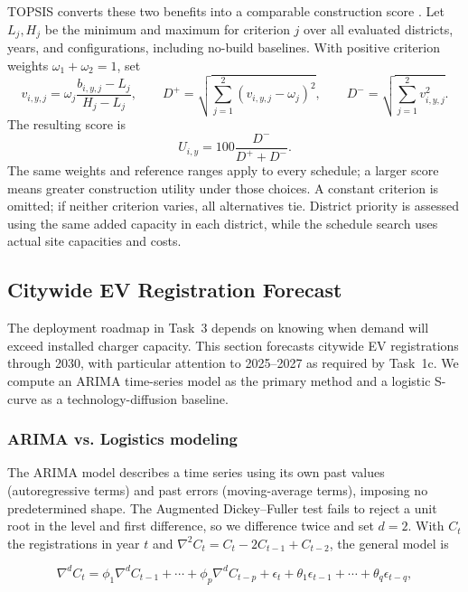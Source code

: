 \documentclass[12pt]{article}
\begin{document}
TOPSIS converts these two benefits into a comparable construction score
\cite{Hwang1981}. Let $L_j,H_j$ be the minimum and maximum for criterion $j$ over all
evaluated districts, years, and configurations, including no-build baselines. With
positive criterion weights $\omega_1+\omega_2=1$, set
\begin{equation}
v_{i,y,j}=\omega_j\frac{b_{i,y,j}-L_j}{H_j-L_j},\qquad
D^+=\sqrt{\sum_{j=1}^2(v_{i,y,j}-\omega_j)^2},\qquad
D^-=\sqrt{\sum_{j=1}^2v_{i,y,j}^2}.
\label{eq:normalize}
\end{equation}
The resulting score is
\begin{equation}
U_{i,y}=100\frac{D^-}{D^++D^-}.\label{eq:topsis}
\end{equation}
The same weights and reference ranges apply to every schedule; a larger score means
greater construction utility under those choices. A constant criterion is omitted;
if neither criterion varies, all alternatives tie. District priority is assessed using
the same added capacity in each district, while the schedule search uses actual site
capacities and costs.

\subsection{Citywide EV Registration Forecast}
\label{sec:forecast}

The deployment roadmap in Task~3 depends on knowing when demand will exceed installed charger capacity. This section forecasts citywide EV registrations through 2030, with particular attention to 2025--2027 as required by Task~1c. We compute an ARIMA time-series model as the primary method and a logistic S-curve as a technology-diffusion baseline.

\subsubsection{ARIMA vs. Logistics modeling}
The ARIMA model describes a time series using its own past values (autoregressive terms) and past errors (moving-average terms), imposing no predetermined shape. The Augmented Dickey--Fuller test fails to reject a unit root in the level and first difference, so we difference twice and set $d = 2$. With $C_t$ the registrations in year $t$ and $\nabla^2 C_t = C_t - 2C_{t-1} + C_{t-2}$, the general model is

\begin{equation}
\nabla^d C_t = \phi_1 \nabla^d C_{t-1} + \cdots + \phi_p \nabla^d C_{t-p} + \epsilon_t + \theta_1 \epsilon_{t-1} + \cdots + \theta_q \epsilon_{t-q},
\label{eq:arima}
\end{equation}
\end{document}
